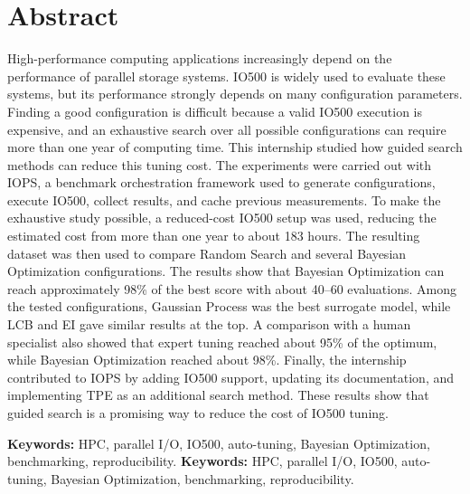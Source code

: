 \section*{Abstract}


High-performance computing applications increasingly depend on the
performance of parallel storage systems. IO500 is widely used to evaluate
these systems, but its performance strongly depends on many configuration
parameters. Finding a good configuration is difficult because a valid
IO500 execution is expensive, and an exhaustive search over all possible
configurations can require more than one year of computing time. This
internship studied how guided search methods can reduce this tuning cost.
The experiments were carried out with IOPS, a benchmark orchestration
framework used to generate configurations, execute IO500, collect results,
and cache previous measurements. To make the exhaustive study possible, a
reduced-cost IO500 setup was used, reducing the estimated cost from more
than one year to about 183 hours. The resulting dataset was then used to
compare Random Search and several Bayesian Optimization configurations.
The results show that Bayesian Optimization can reach approximately 98\%
of the best score with about 40--60 evaluations. Among the tested
configurations, Gaussian Process was the best surrogate model, while LCB
and EI gave similar results at the top. A comparison with a human
specialist also showed that expert tuning reached about 95\% of the
optimum, while Bayesian Optimization reached about 98\%. Finally, the
internship contributed to IOPS by adding IO500 support, updating its
documentation, and implementing TPE as an additional search method. These
results show that guided search is a promising way to reduce the cost of
IO500 tuning.

\vspace{1em}

\noindent\textbf{Keywords:} HPC, parallel I/O, IO500, auto-tuning,
Bayesian Optimization, benchmarking, reproducibility.
\vspace{1em}
\noindent\textbf{Keywords:} HPC, parallel I/O, IO500, auto-tuning, Bayesian
Optimization, benchmarking, reproducibility.

